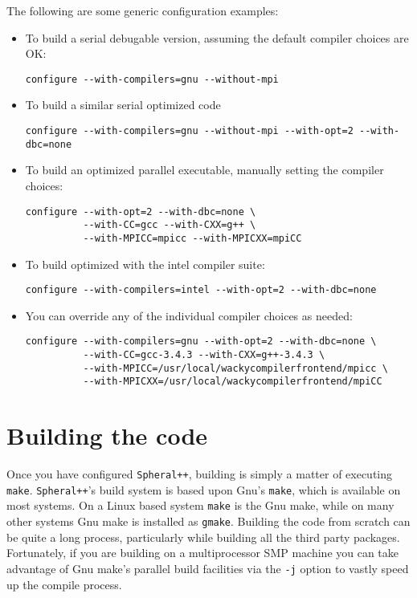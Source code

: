 \documentclass{article}
\newcommand{\Spheral}{{\tt Spheral++}}
\begin{document}
The following are some generic configuration examples:

\begin{itemize}
\item To build a serial debugable version, assuming the default compiler choices are OK:
\begin{verbatim}
configure --with-compilers=gnu --without-mpi
\end{verbatim}

\item To build a similar serial optimized code
\begin{verbatim}
configure --with-compilers=gnu --without-mpi --with-opt=2 --with-dbc=none
\end{verbatim}

\item To build an optimized parallel executable, manually setting the compiler choices:
\begin{verbatim}
configure --with-opt=2 --with-dbc=none \
          --with-CC=gcc --with-CXX=g++ \
          --with-MPICC=mpicc --with-MPICXX=mpiCC
\end{verbatim}

\item To build optimized with the intel compiler suite:
\begin{verbatim}
configure --with-compilers=intel --with-opt=2 --with-dbc=none
\end{verbatim}

\item You can override any of the individual compiler choices as needed:
\begin{verbatim}
configure --with-compilers=gnu --with-opt=2 --with-dbc=none \ 
          --with-CC=gcc-3.4.3 --with-CXX=g++-3.4.3 \ 
          --with-MPICC=/usr/local/wackycompilerfrontend/mpicc \ 
          --with-MPICXX=/usr/local/wackycompilerfrontend/mpiCC
\end{verbatim}

\end{itemize}

\section{Building the code}

Once you have configured \Spheral, building is simply a matter of executing {\tt make}.  \Spheral's build system is based upon Gnu's \verb+make+, which is available on most systems.  On a Linux based system \verb+make+ is the Gnu make, while on many other systems Gnu make is installed as \verb+gmake+.  Building the code from scratch can be quite a long process, particularly while building all the third party packages.  Fortunately, if you are building on a multiprocessor SMP machine you can take advantage of Gnu make's parallel build facilities via the \verb+-j+ option to vastly speed up the compile process.
\end{document}

